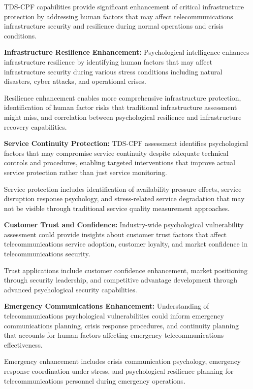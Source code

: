 \documentclass[10pt, twocolumn]{article}
\begin{document}
TDS-CPF capabilities provide significant enhancement of critical infrastructure protection by addressing human factors that may affect telecommunications infrastructure security and resilience during normal operations and crisis conditions.

\textbf{Infrastructure Resilience Enhancement:} Psychological intelligence enhances infrastructure resilience by identifying human factors that may affect infrastructure security during various stress conditions including natural disasters, cyber attacks, and operational crises.

Resilience enhancement enables more comprehensive infrastructure protection, identification of human factor risks that traditional infrastructure assessment might miss, and correlation between psychological resilience and infrastructure recovery capabilities.

\textbf{Service Continuity Protection:} TDS-CPF assessment identifies psychological factors that may compromise service continuity despite adequate technical controls and procedures, enabling targeted interventions that improve actual service protection rather than just service monitoring.

Service protection includes identification of availability pressure effects, service disruption response psychology, and stress-related service degradation that may not be visible through traditional service quality measurement approaches.

\textbf{Customer Trust and Confidence:} Industry-wide psychological vulnerability assessment could provide insights about customer trust factors that affect telecommunications service adoption, customer loyalty, and market confidence in telecommunications security.

Trust applications include customer confidence enhancement, market positioning through security leadership, and competitive advantage development through advanced psychological security capabilities.

\textbf{Emergency Communications Enhancement:} Understanding of telecommunications psychological vulnerabilities could inform emergency communications planning, crisis response procedures, and continuity planning that accounts for human factors affecting emergency telecommunications effectiveness.

Emergency enhancement includes crisis communication psychology, emergency response coordination under stress, and psychological resilience planning for telecommunications personnel during emergency operations.
\end{document}
